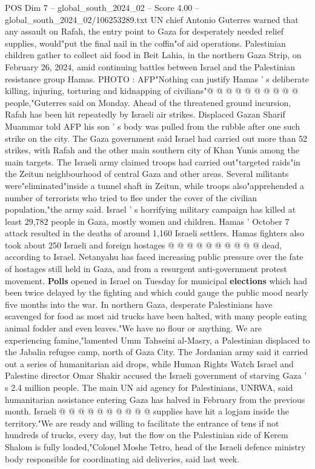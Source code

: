 \begin{textsample}{POS Dim 7 – global\_south\_2024\_02 – Score 4.00 – global\_south\_2024\_02/106253289.txt}
UN chief Antonio Guterres warned that any assault on Rafah, the entry point to Gaza for desperately needed relief supplies, would"put the final nail in the coffin"of aid operations.
Palestinian children gather to collect aid food in Beit Lahia, in the northern Gaza Strip, on February 26, 2024, amid continuing battles between Israel and the Palestinian resistance group Hamas.
PHOTO : AFP"Nothing can justify Hamas ' s deliberate killing, injuring, torturing and kidnapping of civilians"@ @ @ @ @ @ @ @ @ @ people,"Guterres said on Monday.
Ahead of the threatened ground incursion, Rafah has been hit repeatedly by Israeli air strikes.
Displaced Gazan Sharif Muammar told AFP his son ' s body was pulled from the rubble after one such strike on the city.
The Gaza government said Israel had carried out more than 52 strikes, with Rafah and the other main southern city of Khan Yunis among the main targets.
The Israeli army claimed troops had carried out"targeted raids"in the Zeitun neighbourhood of central Gaza and other areas.
Several militants were"eliminated"inside a tunnel shaft in Zeitun, while troops also"apprehended a number of terrorists who tried to flee under the cover of the civilian population,"the army said.
Israel ' s horrifying military campaign has killed at least 29,782 people in Gaza, mostly women and children.
Hamas ' October 7 attack resulted in the deaths of around 1,160 Israeli settlers.
Hamas fighters also took about 250 Israeli and foreign hostages @ @ @ @ @ @ @ @ @ @ dead, according to Israel.
Netanyahu has faced increasing public pressure over the fate of hostages still held in Gaza, and from a resurgent anti-government protest movement. \textbf{Polls} opened in Israel on Tuesday for municipal \textbf{elections} which had been twice delayed by the fighting and which could gauge the public mood nearly five months into the war.
In northern Gaza, desperate Palestinians have scavenged for food as most aid trucks have been halted, with many people eating animal fodder and even leaves."We have no flour or anything.
We are experiencing famine,"lamented Umm Tahseini al-Masry, a Palestinian displaced to the Jabalia refugee camp, north of Gaza City.
The Jordanian army said it carried out a series of humanitarian aid drops, while Human Rights Watch Israel and Palestine director Omar Shakir accused the Israeli government of starving Gaza ' s 2.4 million people.
The main UN aid agency for Palestinians, UNRWA, said humanitarian assistance entering Gaza has halved in February from the previous month.
Israeli @ @ @ @ @ @ @ @ @ @ supplies have hit a logjam inside the territory."We are ready and willing to facilitate the entrance of tens if not hundreds of trucks, every day, but the flow on the Palestinian side of Kerem Shalom is fully loaded,"Colonel Moshe Tetro, head of the Israeli defence ministry body responsible for coordinating aid deliveries, said last week.

\end{textsample}
